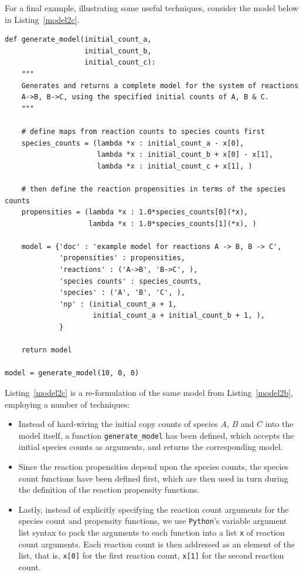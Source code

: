 \documentclass{article}
\newcommand{\mono}[1]{\texttt{#1}}
\newcommand{\python}{\mono{Python}}
\newcommand{\lstref}[1]{Listing~\ref{#1}}
\begin{document}
For a final example, illustrating some useful techniques, consider the model
below in \lstref{model2c}.

\begin{lstlisting}[frame=tb,
caption={Automatic generation of models for the sustem
$A \rightarrow B$, $B \rightarrow C$, using specified
initial copy counts of the species $A$, $B$ and $C$.},
label=model2c]
def generate_model(initial_count_a,
                   initial_count_b,
                   initial_count_c):
    """
    Generates and returns a complete model for the system of reactions
    A->B, B->C, using the specified initial counts of A, B & C.
    """
    
    # define maps from reaction counts to species counts first
    species_counts = (lambda *x : initial_count_a - x[0],
                      lambda *x : initial_count_b + x[0] - x[1],
                      lambda *x : initial_count_c + x[1], )
    
    # then define the reaction propensities in terms of the species counts
    propensities = (lambda *x : 1.0*species_counts[0](*x),
                    lambda *x : 1.0*species_counts[1](*x), )
    
    model = {'doc' : 'example model for reactions A -> B, B -> C',
             'propensities' : propensities,
             'reactions' : ('A->B', 'B->C', ),
             'species counts' : species_counts,
             'species' : ('A', 'B', 'C', ),
             'np' : (initial_count_a + 1,
                     initial_count_a + initial_count_b + 1, ),
             }
    
    return model

model = generate_model(10, 0, 0)
\end{lstlisting}

\lstref{model2c} is a re-formulation of the same model from
\lstref{model2b}, employing a number of techniques:
\begin{itemize}
  \item Instead of hard-wiring the initial copy counts of species $A$, $B$ and
  $C$ into the model itself, a function \mono{generate\_model} has been
  defined, which accepts the initial species counts as arguments, and returns
  the corresponding model.
  \item Since the reaction propensities depend upon the species counts, the
  species count functions have been defined first, which are then used in
  turn during the definition of the reaction propensity functions.
  \item Lastly, instead of explicitly specifying the reaction count arguments
  for the species count and propensity functions, we use \python{}'s variable
  argument list syntax to pack the arguments to each function
  into a list \mono{x} of reaction count arguments. Each reaction count is then
  addressed as an element of the list, that is, \mono{x[0]} for the first 
  reaction count, \mono{x[1]} for the second reaction count.
\end{itemize}
\end{document}
